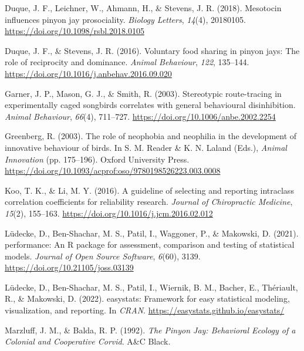 \documentclass[
  pub]{apa6}
\newlength{\cslhangindent}
\newlength{\cslentryspacingunit} %
\newenvironment{CSLReferences}[2] %
 {%
  \setlength{\parindent}{0pt}
  \ifodd #1
  \let\oldpar\par
  \def\par{\hangindent=\cslhangindent\oldpar}
  \fi
  \setlength{\parskip}{#2\cslentryspacingunit}
 }%
 {}
\begin{document}
\begin{CSLReferences}{1}{0}
\leavevmode{}%
Duque, J. F., Leichner, W., Ahmann, H., \& Stevens, J. R. (2018). Mesotocin influences pinyon jay prosociality. \emph{Biology Letters}, \emph{14}(4), 20180105. \url{https://doi.org/10.1098/rsbl.2018.0105}

\leavevmode{}%
Duque, J. F., \& Stevens, J. R. (2016). Voluntary food sharing in pinyon jays: The role of reciprocity and dominance. \emph{Animal Behaviour}, \emph{122}, 135--144. \url{https://doi.org/10.1016/j.anbehav.2016.09.020}

\leavevmode{}%
Garner, J. P., Mason, G. J., \& Smith, R. (2003). Stereotypic route-tracing in experimentally caged songbirds correlates with general behavioural disinhibition. \emph{Animal Behaviour}, \emph{66}(4), 711--727. \url{https://doi.org/10.1006/anbe.2002.2254}

\leavevmode{}%
Greenberg, R. (2003). The role of neophobia and neophilia in the development of innovative behaviour of birds. In S. M. Reader \& K. N. Laland (Eds.), \emph{Animal {Innovation}} (pp. 175--196). {Oxford University Press}. \url{https://doi.org/10.1093/acprof:oso/9780198526223.003.0008}

\leavevmode{}%
Koo, T. K., \& Li, M. Y. (2016). A guideline of selecting and reporting intraclass correlation coefficients for reliability research. \emph{Journal of Chiropractic Medicine}, \emph{15}(2), 155--163. \url{https://doi.org/10.1016/j.jcm.2016.02.012}

\leavevmode{}%
Lüdecke, D., Ben-Shachar, M. S., Patil, I., Waggoner, P., \& Makowski, D. (2021). {performance}: An {R} package for assessment, comparison and testing of statistical models. \emph{Journal of Open Source Software}, \emph{6}(60), 3139. \url{https://doi.org/10.21105/joss.03139}

\leavevmode{}%
Lüdecke, D., Ben-Shachar, M. S., Patil, I., Wiernik, B. M., Bacher, E., Thériault, R., \& Makowski, D. (2022). {easystats}: Framework for easy statistical modeling, visualization, and reporting. In \emph{CRAN}. \url{https://easystats.github.io/easystats/}

\leavevmode{}%
Marzluff, J. M., \& Balda, R. P. (1992). \emph{The {Pinyon Jay}: {Behavioral Ecology} of a {Colonial} and {Cooperative Corvid}}. {A\&C Black}.


\end{CSLReferences}
\end{document}
